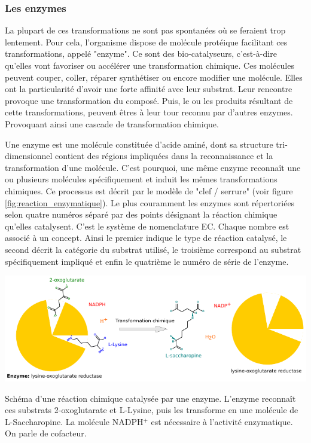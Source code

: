 \begin{refsegment}
    \subsubsection{Les enzymes}    
    La plupart de ces transformations ne sont pas spontanées où se feraient trop lentement. Pour cela, l'organisme dispose de molécule protéique facilitant ces transformations, appelé "enzyme". Ce sont des bio-catalyseurs, c'est-à-dire qu'elles vont favoriser ou accélérer une transformation chimique. Ces molécules peuvent couper, coller, réparer synthétiser ou encore modifier une molécule. Elles ont la particularité d'avoir une forte affinité avec leur substrat.  Leur rencontre provoque une transformation du composé. Puis, le ou les produits résultant de cette transformations, peuvent êtres à leur tour reconnu par d'autres enzymes. Provoquant ainsi une cascade de transformation chimique. 
    
    Une enzyme est une molécule constituée d'acide aminé, dont sa structure tri-dimensionnel contient des régions impliquées dans la reconnaissance et la transformation d’une molécule. C'est pourquoi, une même enzyme reconnaît une ou plusieurs molécules spécifiquement et induit les mêmes transformations chimiques. Ce processus est décrit par le modèle de "clef / serrure" (voir figure \ref{fig:reaction_enzymatique}). Le plus couramment les enzymes sont répertoriées selon quatre numéros séparé par des points désignant la réaction chimique qu'elles catalysent. C'est le système de nomenclature \gls{EC}. Chaque nombre est associé à un concept. Ainsi le premier indique le type de réaction catalysé,  le second décrit la catégorie du substrat utilisé, le troisième correspond au substrat spécifiquement impliqué et enfin le quatrième le numéro de série de l'enzyme.
    
    \begin{shadedfigure}
        \centering
        \includegraphics[width=\textwidth]{img/lysine-oxoglutarate_reductase.pdf}
        \caption{Schéma d'une réaction chimique catalysée par une enzyme. L'enzyme reconnaît ces substrats 2-oxoglutarate et L-Lysine, puis les transforme en une molécule de L-Saccharopine. La molécule NADPH$^{+}$ est nécessaire à l'activité enzymatique. On parle de cofacteur.}
        \label{fig:reaction_enzymatique}
    \end{shadedfigure}
    

\end{refsegment}
